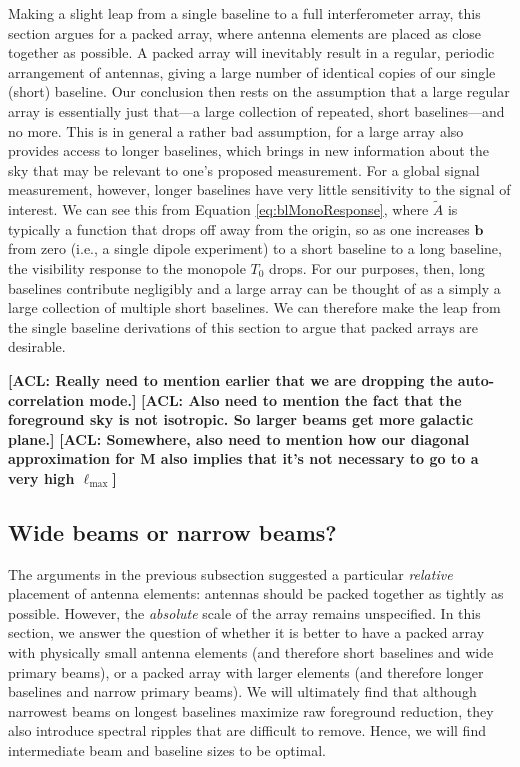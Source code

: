 \documentclass[twolcolumn,apj,iop,numberedappendix]{emulateapj}
\newcommand{\M}{\mathbf{M}}
\newcommand{\acl}[1]{{\color{red} \textbf{[ACL:  #1]}}}
\begin{document}
Making a slight leap from a single baseline to a full interferometer array, this section argues for a packed array, where antenna elements are placed as close together as possible. A packed array will inevitably result in a regular, periodic arrangement of antennas, giving a large number of identical copies of our single (short) baseline. Our conclusion then rests on the assumption that a large regular array is essentially just that---a large collection of repeated, short baselines---and no more. This is in general a rather bad assumption, for a large array also provides access to longer baselines, which brings in new information about the sky that may be relevant to one's proposed measurement. For a global signal measurement, however, longer baselines have very little sensitivity to the signal of interest. We can see this from Equation \eqref{eq:blMonoResponse}, where $\widetilde{A}$ is typically a function that drops off away from the origin, so as one increases $\mathbf{b}$ from zero (i.e., a single dipole experiment) to a short baseline to a long baseline, the visibility response to the monopole $T_0$ drops. For our purposes, then, long baselines contribute negligibly and a large array can be thought of as a simply a large collection of multiple short baselines. We can therefore make the leap from the single baseline derivations of this section to argue that packed arrays are desirable.

\acl{Really need to mention earlier that we are dropping the auto-correlation mode.}
\acl{Also need to mention the fact that the foreground sky is not isotropic. So larger beams get more galactic plane.}
\acl{Somewhere, also need to mention how our diagonal approximation for $\M$ also implies that it's not necessary to go to a very high $\ell_\textrm{max}$}

\subsection{Wide beams or narrow beams?}
\label{sec:beamSize}

The arguments in the previous subsection suggested a particular \emph{relative} placement of antenna elements: antennas should be packed together as tightly as possible. However, the \emph{absolute} scale of the array remains unspecified. In this section, we answer the question of whether it is better to have a packed array with physically small antenna elements (and therefore short baselines and wide primary beams), or a packed array with larger elements (and therefore longer baselines and narrow primary beams). We will ultimately find that although narrowest beams on longest baselines maximize raw foreground reduction, they also introduce spectral ripples that are difficult to remove. Hence, we will find intermediate beam and baseline sizes to be optimal.
\end{document}
